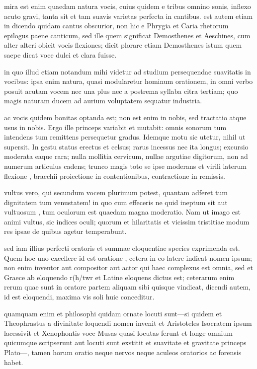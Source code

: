  mira est enim quaedam natura vocis, cuius quidem e tribus omnino sonis, inflexo acuto gravi, tanta sit et tam suavis varietas perfecta in cantibus. est autem etiam in dicendo quidam cantus obscurior, non hic e Phrygia et Caria rhetorum epilogus paene canticum, sed ille quem significat Demosthenes et Aeschines, cum alter alteri obicit vocis flexiones; dicit plorare etiam Demosthenes istum quem saepe dicat voce dulci et clara fuisse.

 in quo illud etiam notandum mihi videtur ad studium persequendae suavitatis in vocibus: ipsa enim natura, quasi modularetur hominum orationem, in omni verbo posuit acutam vocem nec una plus nec a postrema syllaba citra tertiam; quo magis naturam ducem ad aurium voluptatem sequatur industria.

 ac vocis quidem bonitas optanda est; non est enim in nobis, sed tractatio atque usus in nobis. Ergo ille princeps variabit et mutabit: omnis sonorum tum intendens tum remittens persequetur gradus. Idemque motu sic utetur, nihil ut supersit. In gestu status erectus et celsus; rarus incessus nec ita longus; excursio moderata eaque rara; nulla mollitia cervicum, nullae argutiae digitorum, non ad numerum articulus cadens; trunco magis toto se ipse moderans et virili laterum flexione , bracchii proiectione in contentionibus, contractione in remissis.

 vultus vero, qui secundum vocem plurimum potest, quantam adferet tum dignitatem tum venustatem! in quo cum effeceris ne quid ineptum sit aut vultuosum , tum oculorum est quaedam magna moderatio. Nam ut imago est animi vultus, sic indices oculi; quorum et hilaritatis et vicissim tristitiae modum res ipsae de quibus agetur temperabunt.

 sed iam illius perfecti oratoris et summae eloquentiae species exprimenda est. Quem hoc uno excellere id est oratione , cetera in eo latere indicat nomen ipsum; non enim inventor aut compositor aut actor qui haec complexus est omnia, sed et Graece ab eloquendo r(h/twr et Latine eloquens dictus est; ceterarum enim rerum quae sunt in oratore partem aliquam sibi quisque vindicat, dicendi autem, id est eloquendi, maxima vis soli huic conceditur.

 quamquam enim et philosophi quidam ornate locuti sunt—si quidem et Theophrastus a divinitate loquendi nomen invenit et Aristoteles Isocratem ipsum lacessivit et Xenophontis voce Musas quasi locutas ferunt et longe omnium quicumque scripserunt aut locuti sunt exstitit et suavitate et gravitate princeps Plato—, tamen horum oratio neque nervos neque aculeos oratorios ac forensis habet.

